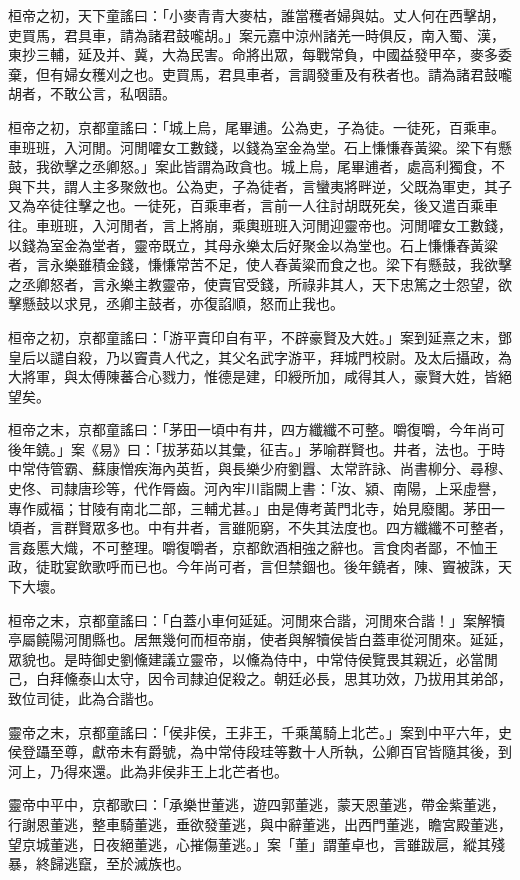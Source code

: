 \begin{pinyinscope}
桓帝之初，天下童謠曰：「小麥青青大麥枯，誰當穫者婦與姑。丈人何在西擊胡，吏買馬，君具車，請為諸君鼓嚨胡。」案元嘉中涼州諸羌一時俱反，南入蜀、漢，東抄三輔，延及并、冀，大為民害。命將出眾，每戰常負，中國益發甲卒，麥多委棄，但有婦女穫刈之也。吏買馬，君具車者，言調發重及有秩者也。請為諸君鼓嚨胡者，不敢公言，私咽語。

桓帝之初，京都童謠曰：「城上烏，尾畢逋。公為吏，子為徒。一徒死，百乘車。車班班，入河閒。河閒嚯女工數錢，以錢為室金為堂。石上慊慊舂黃粱。梁下有懸鼓，我欲擊之丞卿怒。」案此皆謂為政貪也。城上烏，尾畢逋者，處高利獨食，不與下共，謂人主多聚斂也。公為吏，子為徒者，言蠻夷將畔逆，父既為軍吏，其子又為卒徒往擊之也。一徒死，百乘車者，言前一人往討胡既死矣，後又遣百乘車往。車班班，入河閒者，言上將崩，乘輿班班入河閒迎靈帝也。河閒嚯女工數錢，以錢為室金為堂者，靈帝既立，其母永樂太后好聚金以為堂也。石上慊慊舂黃粱者，言永樂雖積金錢，慊慊常苦不足，使人舂黃粱而食之也。梁下有懸鼓，我欲擊之丞卿怒者，言永樂主教靈帝，使賣官受錢，所祿非其人，天下忠篤之士怨望，欲擊懸鼓以求見，丞卿主鼓者，亦復諂順，怒而止我也。

桓帝之初，京都童謠曰：「游平賣印自有平，不辟豪賢及大姓。」案到延熹之末，鄧皇后以譴自殺，乃以竇貴人代之，其父名武字游平，拜城門校尉。及太后攝政，為大將軍，與太傅陳蕃合心戮力，惟德是建，印綬所加，咸得其人，豪賢大姓，皆絕望矣。

桓帝之末，京都童謠曰：「茅田一頃中有井，四方纖纖不可整。嚼復嚼，今年尚可後年鐃。」案《易》曰：「拔茅茹以其彙，征吉。」茅喻群賢也。井者，法也。于時中常侍管霸、蘇康憎疾海內英哲，與長樂少府劉囂、太常許詠、尚書柳分、尋穆、史佟、司隸唐珍等，代作脣齒。河內牢川詣闕上書：「汝、潁、南陽，上采虛譽，專作威福；甘陵有南北二部，三輔尤甚。」由是傳考黃門北寺，始見廢閣。茅田一頃者，言群賢眾多也。中有井者，言雖阨窮，不失其法度也。四方纖纖不可整者，言姦慝大熾，不可整理。嚼復嚼者，京都飲酒相強之辭也。言食肉者鄙，不恤王政，徒耽宴飲歌呼而已也。今年尚可者，言但禁錮也。後年鐃者，陳、竇被誅，天下大壞。

桓帝之末，京都童謠曰：「白蓋小車何延延。河閒來合諧，河閒來合諧！」案解犢亭屬饒陽河閒縣也。居無幾何而桓帝崩，使者與解犢侯皆白蓋車從河閒來。延延，眾貌也。是時御史劉儵建議立靈帝，以儵為侍中，中常侍侯覽畏其親近，必當閒己，白拜儵泰山太守，因令司隸迫促殺之。朝廷必長，思其功效，乃拔用其弟郃，致位司徒，此為合諧也。

靈帝之末，京都童謠曰：「侯非侯，王非王，千乘萬騎上北芒。」案到中平六年，史侯登躡至尊，獻帝未有爵號，為中常侍段珪等數十人所執，公卿百官皆隨其後，到河上，乃得來還。此為非侯非王上北芒者也。

靈帝中平中，京都歌曰：「承樂世董逃，遊四郭董逃，蒙天恩董逃，帶金紫董逃，行謝恩董逃，整車騎董逃，垂欲發董逃，與中辭董逃，出西門董逃，瞻宮殿董逃，望京城董逃，日夜絕董逃，心摧傷董逃。」案「董」謂董卓也，言雖跋扈，縱其殘暴，終歸逃竄，至於滅族也。


\end{pinyinscope}
